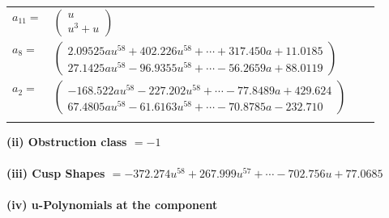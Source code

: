 \documentclass[1p]{elsarticle_modified}
\theoremstyle{definition}
\begin{document}
\begin{tabular}{m{7pt} m{180pt} m{7pt} m{180pt} }
\flushright $a_{11}=$&$\begin{pmatrix}u\\u^3+u\end{pmatrix}$ \\
\flushright $a_{8}=$&$\begin{pmatrix}2.09525 a u^{58}+402.226 u^{58}+\cdots+317.450 a+11.0185\\27.1425 a u^{58}-96.9355 u^{58}+\cdots-56.2659 a+88.0119\end{pmatrix}$ \\
\flushright $a_{2}=$&$\begin{pmatrix}-168.522 a u^{58}-227.202 u^{58}+\cdots-77.8489 a+429.624\\67.4805 a u^{58}-61.6163 u^{58}+\cdots-70.8785 a-232.710\end{pmatrix}$\\&\end{tabular}
\flushleft \textbf{(ii) Obstruction class $= -1$}\\~\\
\flushleft \textbf{(iii) Cusp Shapes $= -372.274 u^{58}+267.999 u^{57}+\cdots-702.756 u+77.0685$}\\~\\
\newpage\renewcommand{\arraystretch}{1}
\flushleft \textbf{(iv) u-Polynomials at the component}\newline \\
\end{document}
